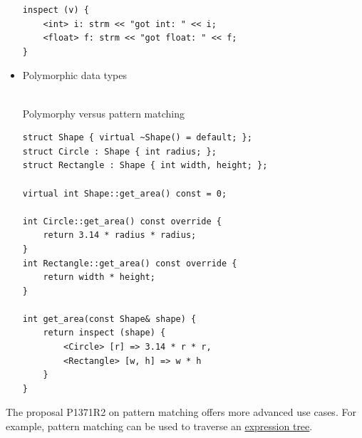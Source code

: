 \begin{itemize}
\begin{lstlisting}[style=styleCXX]
inspect (v) {
	<int> i: strm << "got int: " << i;
	<float> f: strm << "got float: " << f;
}
\end{lstlisting}

\item 
Polymorphic data types

\hspace*{\fill} \\ %
\noindent
Polymorphy versus pattern matching
\begin{lstlisting}[style=styleCXX]
struct Shape { virtual ~Shape() = default; };
struct Circle : Shape { int radius; };
struct Rectangle : Shape { int width, height; };

virtual int Shape::get_area() const = 0;

int Circle::get_area() const override {
	return 3.14 * radius * radius;
}
int Rectangle::get_area() const override {
	return width * height;
}

int get_area(const Shape& shape) {
	return inspect (shape) {
		<Circle> [r] => 3.14 * r * r,
		<Rectangle> [w, h] => w * h
	}
}
\end{lstlisting}
\end{itemize}

The proposal P1371R2 on pattern matching offers more advanced use cases. For example, pattern matching can be used to traverse an \href{https://en.wikipedia.org/wiki/Binary_expression_tree}{expression tree}.








